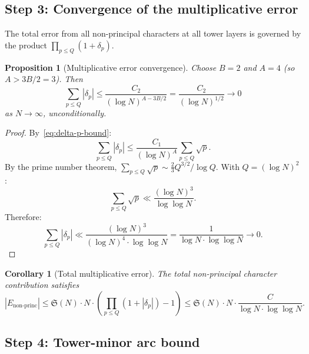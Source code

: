 \documentclass[11pt,a4paper]{article}
\newtheorem{proposition}[theorem]{Proposition}
\newtheorem{corollary}[theorem]{Corollary}
\theoremstyle{remark}
\begin{document}
\subsection{Step 3: Convergence of the multiplicative error}
\label{subsec:multiplicative-convergence}

The total error from all non-principal characters at all tower layers
is governed by the product $\prod_{p \leq Q}(1 + \delta_p)$.

\begin{proposition}[Multiplicative error convergence]
\label{prop:mult-conv}
Choose $B = 2$ and $A = 4$ (so $A > 3B/2 = 3$).  Then
\begin{equation}
\label{eq:mult-conv}
  \sum_{p \leq Q}|\delta_p| \leq \frac{C_2}{(\log N)^{A - 3B/2}}
    = \frac{C_2}{(\log N)^{1/2}} \to 0
\end{equation}
as $N \to \infty$, unconditionally.
\end{proposition}

\begin{proof}
By~\eqref{eq:delta-p-bound}:
\begin{equation}
  \sum_{p \leq Q}|\delta_p| \leq \frac{C_1}{(\log N)^A}
    \sum_{p \leq Q}\sqrt{p}.
\end{equation}
By the prime number theorem, $\sum_{p \leq Q}\sqrt{p} \sim \frac{2}{3}
Q^{3/2}/\log Q$.  With $Q = (\log N)^2$:
\begin{equation}
  \sum_{p \leq Q}\sqrt{p} \ll \frac{(\log N)^3}{\log\log N}.
\end{equation}
Therefore:
\begin{equation}
  \sum_{p \leq Q}|\delta_p| \ll \frac{(\log N)^3}{(\log N)^4 \cdot \log\log N}
    = \frac{1}{\log N \cdot \log\log N} \to 0.
\end{equation}
\end{proof}

\begin{corollary}[Total multiplicative error]
\label{cor:total-mult}
The total non-principal character contribution satisfies
\begin{equation}
\label{eq:total-non-princ}
  |E_{\text{non-princ}}| \leq \mathfrak{S}(N) \cdot N \cdot
    \left(\prod_{p \leq Q}(1+|\delta_p|) - 1\right)
    \leq \mathfrak{S}(N) \cdot N \cdot \frac{C}{\log N \cdot \log\log N}.
\end{equation}
\end{corollary}

\subsection{Step 4: Tower-minor arc bound}
\label{subsec:tower-minor}
\end{document}
